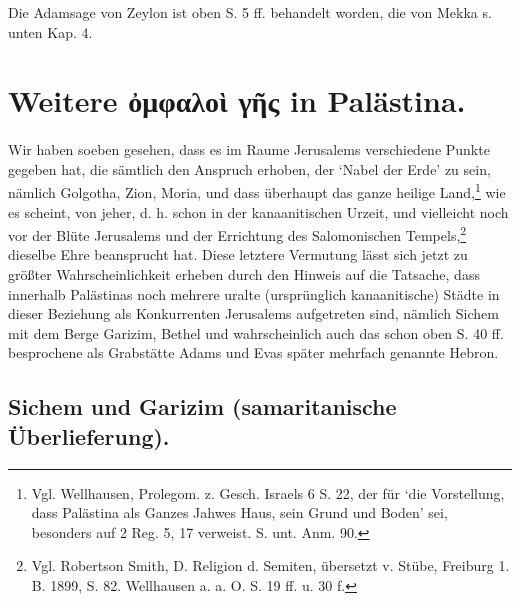 \documentclass[a4paper, 11pt, oneside]{article}
\begin{document}
Die Adamsage von Zeylon ist oben S. 5 ff. behandelt worden, die von Mekka s. unten Kap. 4.
\clearpage
\section{Weitere ὀμφαλοὶ γῆς in Palästina.}
\paragraph{}
Wir haben soeben gesehen, dass es im Raume Jerusalems verschiedene Punkte gegeben hat, die sämtlich den Anspruch erhoben, der `Nabel der Erde' zu sein, nämlich Golgotha, Zion, Moria, und dass überhaupt das ganze heilige Land,\footnote{Vgl. Wellhausen, Prolegom. z. Gesch. Israels 6 S. 22, der für `die Vorstellung, dass Palästina als Ganzes Jahwes Haus, sein Grund und Boden' sei, besonders auf 2 Reg. 5, 17 verweist. S. unt. Anm. 90.} wie es scheint, von jeher, d. h. schon in der kanaanitischen Urzeit, und vielleicht noch vor der Blüte Jerusalems und der Errichtung des Salomonischen Tempels,\footnote{Vgl. Robertson Smith, D. Religion d. Semiten, übersetzt v. Stübe, Freiburg 1. B. 1899, S. 82. Wellhausen a. a. O. S. 19 ff. u. 30 f.} dieselbe Ehre beansprucht hat. Diese letztere Vermutung lässt sich jetzt zu größter Wahrscheinlichkeit erheben durch den Hinweis auf die Tatsache, dass innerhalb Palästinas noch mehrere uralte (ursprünglich kanaanitische) Städte in dieser Beziehung als Konkurrenten Jerusalems aufgetreten sind, nämlich Sichem mit dem Berge Garizim, Bethel und wahrscheinlich auch das schon oben S. 40 ff. besprochene als Grabstätte Adams und Evas später mehrfach genannte Hebron.

\subsection{Sichem und Garizim (samaritanische Überlieferung).}
\end{document}
